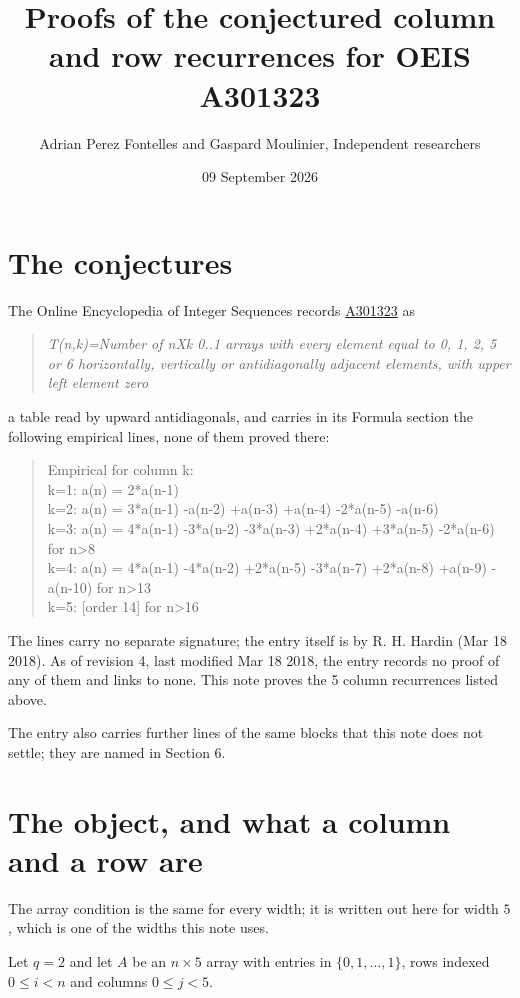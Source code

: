 \documentclass[11pt]{article}
\title{Proofs of the conjectured column and row recurrences for OEIS A301323}
\author{Adrian Perez Fontelles and Gaspard Moulinier, Independent researchers}
\date{09 September 2026}
\theoremstyle{definition}
\begin{document}
\maketitle
\section{The conjectures}

The Online Encyclopedia of Integer Sequences records \href{https://oeis.org/A301323}{A301323} as

\begin{quote}\itshape T(n,k)=Number of nXk 0..1 arrays with every element equal to 0, 1, 2, 5 or 6 horizontally, vertically or antidiagonally adjacent elements, with upper left element zero\end{quote}

a table read by upward antidiagonals, and carries in its Formula section the following empirical lines, none of them proved there:

\begin{quote}\ttfamily Empirical for column k:\\
k=1: a(n) = 2*a(n-1)\\k=2: a(n) = 3*a(n-1) -a(n-2) +a(n-3) +a(n-4) -2*a(n-5) -a(n-6)\\k=3: a(n) = 4*a(n-1) -3*a(n-2) -3*a(n-3) +2*a(n-4) +3*a(n-5) -2*a(n-6) for n>8\\k=4: a(n) = 4*a(n-1) -4*a(n-2) +2*a(n-5) -3*a(n-7) +2*a(n-8) +a(n-9) -a(n-10) for n>13\\k=5: [order 14] for n>16\end{quote}

The lines carry no separate signature; the entry itself is by R. H. Hardin (Mar 18 2018). As of revision 4, last modified Mar 18 2018, the entry records no proof of any of them and links to none. This note proves the 5 column recurrences listed above.

The entry also carries further lines of the same blocks that this note does not settle; they are named in Section 6.

\section{The object, and what a column and a row are}

The array condition is the same for every width; it is written out here for width $5$, which is one of the widths this note uses.

Let $q = 2$ and let $A$ be an $n \times 5$ array with entries in $\{0,1,\dots,1\}$, rows indexed $0 \le i < n$ and columns $0 \le j < 5$.
\end{document}
